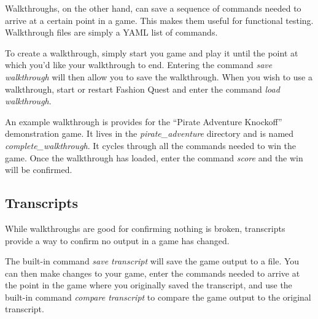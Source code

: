 \documentclass[letterpaper,10pt,english]{sphinxmanual}
\begin{document}
Walkthroughs, on the other hand, can save a sequence of commands needed to arrive at a certain point in a game. This makes them useful for functional testing. Walkthrough files are simply a YAML list of commands.

To create a walkthrough, simply start you game and play it until the point at which you'd like your walkthrough to end. Entering the command \emph{save walkthrough} will then allow you to save the walkthrough. When you wish to use a walkthrough, start or restart Fashion Quest and enter the command \emph{load walkthrough}.

An example walkthrough is provides for the ``Pirate Adventure Knockoff'' demonstration game. It lives in the \emph{pirate\_adventure} directory and is named \emph{complete\_walkthrough}. It cycles through all the commands needed to win the game. Once the walkthrough has loaded, enter the command \emph{score} and the win will be confirmed.


\subsection{Transcripts}
\label{fine_tuning:transcripts}
While walkthroughs are good for confirming nothing is broken, transcripts provide a way to confirm no output in a game has changed.

The built-in command \emph{save transcript} will save the game output to a file. You can then make changes to your game, enter the commands needed to arrive at the point in the game where you originally saved the transcript, and use the built-in command \emph{compare transcript} to compare the game output to the original transcript.



\renewcommand{\indexname}{Index}
\printindex
\end{document}
